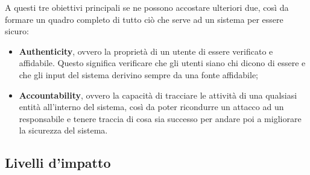 \documentclass[14pt]{extarticle}
\begin{document}
A questi tre obiettivi principali se ne possono accostare ulteriori due, così da formare un quadro completo di tutto ciò che serve ad un sistema per essere sicuro:

\begin{itemize}
    \item \textbf{Authenticity}, ovvero la proprietà di un utente di essere verificato e affidabile. Questo significa verificare che gli utenti siano chi dicono di essere e che gli input del sistema derivino sempre da una fonte affidabile;
    \item \textbf{Accountability}, ovvero la capacità di tracciare le attività di una qualsiasi entità all'interno del sistema, così da poter ricondurre un attacco ad un responsabile e tenere traccia di cosa sia successo per andare poi a migliorare la sicurezza del sistema. 
\end{itemize}

\subsection{Livelli d'impatto}
\end{document}
